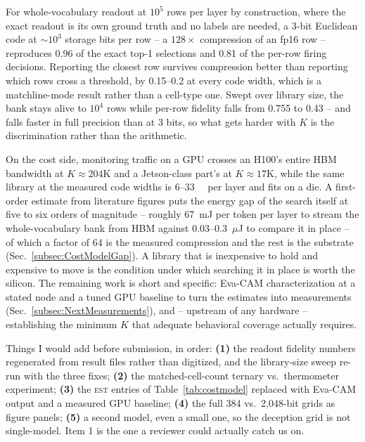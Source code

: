 \documentclass[conference]{IEEEtran}
\begin{document}
For whole-vocabulary readout at $10^{5}$ rows per layer by construction,
where the exact readout is its own ground truth and no labels are needed,
a 3-bit Euclidean code at $\sim$$10^{3}$ storage bits per row -- a
$128\times$ compression of an fp16 row -- reproduces 0.96 of the exact
top-1 selections and 0.81 of the per-row firing decisions. Reporting the
closest row survives compression better than reporting which rows cross a
threshold, by 0.15--0.2 at every code width, which is a matchline-mode
result rather than a cell-type one. Swept over library size, the bank
stays alive to $10^{4}$ rows while per-row fidelity falls from 0.755 to
0.43 -- and falls faster in full precision than at 3 bits, so what gets
harder with $K$ is the discrimination rather than the arithmetic.

On the cost side, monitoring traffic on a GPU crosses an H100's entire
HBM bandwidth at $K\!\approx\!204$K and a Jetson-class part's at
$K\!\approx\!17$K, while the same library at the measured code widths is
6--\qty{33}{\mega\byte} per layer and fits on a die. A first-order
estimate from literature figures puts the energy gap of the search
itself at five to six orders of magnitude -- roughly 67~mJ per token
per layer to stream the whole-vocabulary bank from HBM against
0.03--0.3~$\mu$J to compare it in place -- of which a factor of 64 is
the measured compression and the rest is the substrate
(Sec.~\ref{subsec:CostModelGap}). A library that is inexpensive to
hold and expensive to move is the condition under which searching it
in place is worth the silicon. The remaining work is short and
specific: Eva-CAM characterization at a stated node and a tuned GPU
baseline to turn the estimates into measurements
(Sec.~\ref{subsec:NextMeasurements}), and -- upstream of any hardware
-- establishing the minimum $K$ that adequate behavioral coverage
actually requires.

\begin{pnote}
Things I would add before submission, in order: {\bf (1)} the readout
fidelity numbers regenerated from result files rather than digitized, and
the library-size sweep re-run with the three fixes; {\bf (2)} the
matched-cell-count ternary vs.\ thermometer experiment;
{\bf (3)} the \textsc{est} entries of Table~\ref{tab:costmodel}
replaced with Eva-CAM output and a measured GPU baseline; {\bf (4)} the full
384 vs.\ 2{,}048-bit grids as figure panels; {\bf (5)} a second model,
even a small one, so the deception grid is not single-model. Item 1 is
the one a reviewer could actually catch us on.
\end{pnote}
\end{document}
